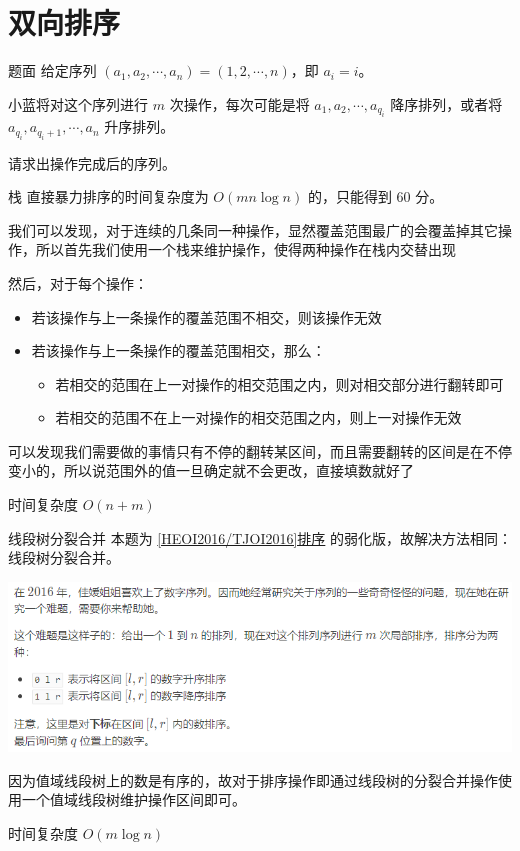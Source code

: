 \documentclass{pptt}
\begin{document}
\section{双向排序}

\begin{frame}{题面}
    给定序列 $(a_1,a_2,\cdots,a_n) = (1,2,\cdots,n)$，即 $a_i=i$。

    小蓝将对这个序列进行 $m$ 次操作，每次可能是将 $a_1,a_2,\cdots,a_{q_i}$ 降序排列，或者将 $a_{q_i},a_{q_i+1},\cdots,a_n$ 升序排列。

    请求出操作完成后的序列。
\end{frame}

\begin{frame}{栈}
    直接暴力排序的时间复杂度为 $O(mn\log{n})$ 的，只能得到 $60$ 分。

    我们可以发现，对于连续的几条同一种操作，显然覆盖范围最广的会覆盖掉其它操作，所以首先我们使用一个栈来维护操作，使得两种操作在栈内交替出现

    然后，对于每个操作：

    \begin{itemize}
        \item 若该操作与上一条操作的覆盖范围不相交，则该操作无效
        \item 若该操作与上一条操作的覆盖范围相交，那么：
              \begin{itemize}
                  \item 若相交的范围在上一对操作的相交范围之内，则对相交部分进行翻转即可
                  \item 若相交的范围不在上一对操作的相交范围之内，则上一对操作无效
              \end{itemize}
    \end{itemize}

    可以发现我们需要做的事情只有不停的翻转某区间，而且需要翻转的区间是在不停变小的，所以说范围外的值一旦确定就不会更改，直接填数就好了

    时间复杂度 $O(n+m)$
\end{frame}

\begin{frame}{线段树分裂合并}
    本题为 \href{https://www.luogu.com.cn/problem/P2824}{\color{blue} [HEOI2016/TJOI2016]排序} 的弱化版，故解决方法相同：线段树分裂合并。

    \begin{center}
        \includegraphics[scale=0.4]{images/sort.png}
    \end{center}

    因为值域线段树上的数是有序的，故对于排序操作即通过线段树的分裂合并操作使用一个值域线段树维护操作区间即可。

    时间复杂度 $O(m\log{n})$
\end{frame}
\end{document}
